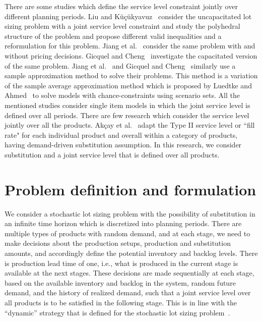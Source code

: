 \documentclass[10pt]{article}
\newcommand{\ti}{t} %
\newcommand{\KA}{\mathcal{K}}
\newcommand{\Ka}{K}
\newcommand{\tAct}{\hat{\ti}} %
\begin{document}
There are some studies which define the service level constraint jointly over different planning periods. Liu and K{\"u}{\c{c}}{\"u}kyavuz~\cite{liu2018polyhedral} consider the uncapacitated lot sizing problem with a joint service level constraint and study the polyhedral structure of the problem and propose different valid inequalities and a reformulation for this problem. Jiang et al.~\cite{jiang2017production} consider the same problem with and without pricing decisions. Gicquel and Cheng~\cite{gicquel2018joint} investigate the capacitated version of the same problem. Jiang et al.~\cite{jiang2017production} and Gicquel and Cheng~\cite{gicquel2018joint} similarly use a sample approximation method to solve their problems. This method is a variation of the sample average approximation method which is proposed by Luedtke and Ahmed~\cite{luedtke2008sample} to solve models with chance-constraints using scenario sets. All the mentioned studies consider single item models in which the joint service level is defined over all periods. There are few research which consider the service level jointly over all the products. Akçay et al.~\cite{akccaycategory} adapt the Type II service level or ``fill rate" for each individual product and overall within a category of products, having demand-driven substitution assumption. In this research, we consider substitution and a joint service level that is defined over all products.


\section{Problem definition and formulation}
We consider a stochastic lot sizing problem with the possibility of substitution in an infinite time horizon which is discretized into planning periods. %
There are multiple types of products with random demand, and at each stage, we need to make decisions about the production setups, production and substitution amounts, and accordingly define the potential inventory and backlog levels. There is production lead time of one, i.e., what is produced in the current stage is available at the next stages. 
These decisions are made sequentially at each stage, based on the available inventory and backlog in the system, random future demand, and the history of realized demand, such that a joint service level over all products is to be satisfied in the following stage. This is in line with the  ``dynamic'' strategy that is defined for the stochastic lot sizing problem~\cite{bookbinder1988strategies}. 
\end{document}
